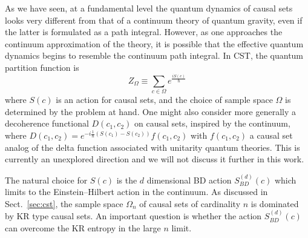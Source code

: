 As we have seen, at  a fundamental level the quantum dynamics of causal sets looks very different
from that of a continuum theory of quantum gravity, even if the latter is formulated as a path integral.  However, as
one approaches the continuum approximation of the theory, it is possible that the effective  quantum dynamics begins to resemble  the
continuum path integral.  In CST,  the quantum partition function is 
\begin{equation} 
  Z_\Omega \equiv  \sum_{c\in \Omega} e^{\frac{i S(c)}{\hbar} }
  \label{eq:pathsum} 
\end{equation}
where  $S(c)$ is an action for causal sets, and the choice of sample space $\Omega$ is determined by the
problem at hand. One might also consider more generally a  decoherence functional $D(c_1,c_2) $ on causal sets, inspired
by the continuum, where $D(c_1,c_2) =e^{-i \frac{1}{\hbar}
  (S(c_1)-S(c_2))}f(c_1,c_2)$ with $f(c_1,c_2)$  a causal set analog of the delta
  function associated with 
  unitarity quantum theories. This is currently an unexplored direction and we will not discuss it further in this
  work. 


The natural  choice for  $S(c)$ is the $d$ dimensional BD action $S_{BD}^{(d)}(c)$ which limits to the Einstein--Hilbert
action in the continuum. As discussed in Sect.~\ref{sec:cst}, the sample space $\Omega_n$ of causal sets  of
cardinality $n$ is dominated by KR type causal sets.  An important question is whether the  action $S_{BD}^{(d)}(c)$ can
overcome the KR entropy  in the large $n$ limit.

